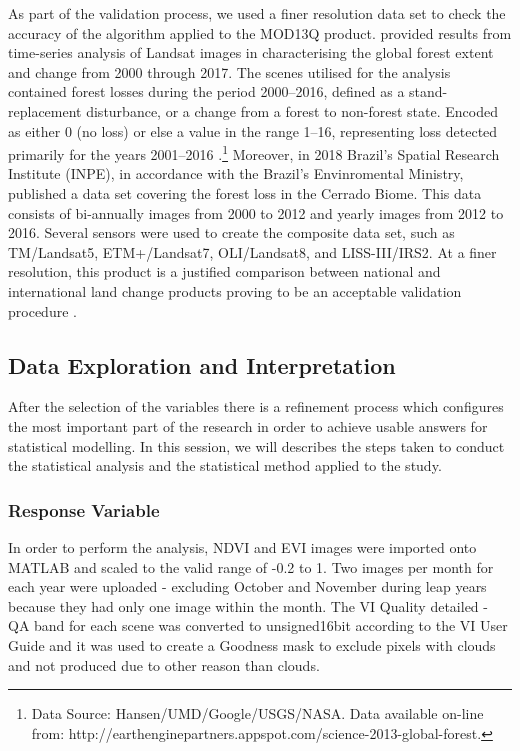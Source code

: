 As part of the validation process, we used a finer resolution data set to check the accuracy of the algorithm applied to the MOD13Q product. \citet{Hansen_2013} provided results from time-series analysis of Landsat images in characterising the global forest extent and change from 2000 through 2017. The scenes utilised for the analysis contained forest losses during the period 2000–2016, defined as a stand-replacement disturbance, or a change from a forest to non-forest state. Encoded as either 0 (no loss) or else a value in the range 1–16, representing loss detected primarily for the years 2001–2016 \citep{gfc_2017}.\footnote{Data Source: Hansen/UMD/Google/USGS/NASA. Data available on-line from: http://earthenginepartners.appspot.com/science-2013-global-forest.} Moreover, in 2018 Brazil's Spatial Research Institute (INPE), in accordance with the Brazil's Envinromental Ministry, published a data set covering the forest loss in the Cerrado Biome. This data consists of bi-annually images from 2000 to 2012 and yearly images from 2012 to 2016. Several sensors were used to create the composite data set, such as TM/Landsat5, ETM+/Landsat7, OLI/Landsat8, and LISS-III/IRS2. At a finer resolution, this product is a justified comparison between national and international land change products proving to be an acceptable validation procedure \citep{brito_2018}.


\subsection{Data Exploration and Interpretation}

After the selection of the variables there is a refinement process which configures the most important part of the research in order to achieve usable answers for statistical modelling. In this session, we will describes the steps taken to conduct the statistical analysis and the statistical method applied to the study.

\subsubsection{Response Variable}  %


In order to perform the analysis, NDVI and EVI images were imported onto MATLAB and scaled to the valid range of -0.2 to 1. Two images per month for each year were uploaded - excluding October and November during leap years because they had only one image within the month. The VI Quality detailed - QA band for each scene was converted to unsigned16bit according to the VI User Guide \citep{didan_munoz_2015} and it was used to create a Goodness mask to exclude pixels with clouds and not produced due to other reason than clouds. 

